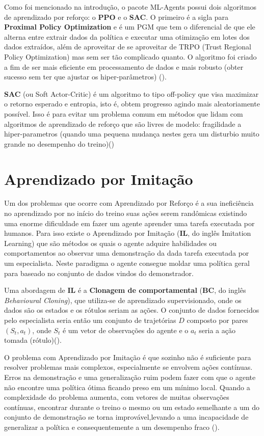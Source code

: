 Como foi mencionado na introdução, o pacote ML-Agents possui dois algoritmos de aprendizado por reforço: o \textbf{PPO} e o \textbf{SAC}. O primeiro é a sigla para \textbf{Proximal Policy Optimization} e é um PGM que tem o diferencial de que ele alterna entre extrair dados da política e executar uma otimização em lotes dos dados extraídos, além de aproveitar de se aproveitar de TRPO (Trust Regional Policy Optimization) mas sem ser tão complicado quanto. O algoritmo foi criado a fim de ser mais eficiente em processamento de dados e mais robusto (obter sucesso sem ter que ajustar os hiper-parâmetros) ().

\textbf{SAC} (ou Soft Actor-Critic) é um algoritmo to tipo off-policy que visa maximizar o retorno esperado e entropia, isto é, obtem progresso agindo mais aleatoriamente possível. Isso é para evitar um problema comum em métodos que lidam com algoritmos de aprendizado de reforço que são livres de modelo: fragilidade a hiper-parametros (quando uma pequena mudança nestes gera um disturbio muito grande no desempenho do treino)()


\section{Aprendizado por Imitação}
Um dos problemas que ocorre com Aprendizado por Reforço é a sua ineficiência no aprendizado por no início do treino suas ações serem randômicas existindo uma enorme dificuldade em fazer um agente aprender uma tarefa executada por humanos. Para isso existe o Aprendizado por Imitação (\textbf{IL}, do inglês Imitation Learning) que são métodos os quais o agente adquire habilidades ou comportamentos ao observar uma demonstração da dada tarefa executada por um especialista. Neste paradigma o agente consegue moldar uma política geral para baseado no conjunto de dados vindos do demonstrador.

Uma abordagem de \textbf{IL} é a \textbf{Clonagem de comportamental} (\textbf{BC}, do inglês \textit{Behavioural Cloning}), que utiliza-se de aprendizado supervisionado, onde os dados são os estados e os rótulos seriam as ações. O conjunto de dados fornecidos pelo especialista seria então um conjunto de trajetórias $D$ composto por pares $(S_t, a_t)$, onde $S_t$ é um vetor de observações do agente e o $a_t$ seria a ação tomada (rótulo)().

O problema com Aprendizado por Imitação é que sozinho não é suficiente para resolver problemas mais complexos, especialmente se envolvem ações contínuas. Erros na demonstração e uma generalização ruim podem fazer com que o agente não encontre uma política ótima ficando preso em um mínimo local. Quando a complexidade do problema aumenta, com vetores de muitas observações contínuas, encontrar durante o treino o mesmo ou um estado semelhante a um do conjunto de demonstração se torna improvável,levando a uma incapacidade de generalizar a política e consequentemente a um desempenho fraco ().

